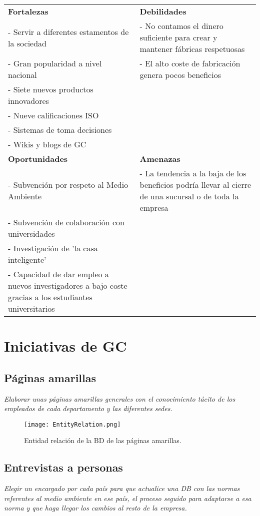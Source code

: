 \documentclass[a4paper]{article}
\begin{document}
\begin{table}[ht!]
	\centering
	\begin{tabular}{p{6cm}|p{6cm}}
		\textbf{Fortalezas} & \textbf{Debilidades}\\
		- Servir a diferentes estamentos de la sociedad & - No contamos el dinero suficiente para crear y mantener fábricas respetuosas \\
		- Gran popularidad a nivel nacional & - El alto coste de fabricación genera pocos beneficios \\
		- Siete nuevos productos innovadores & \\
		- Nueve calificaciones ISO & \\
		- Sistemas de toma decisiones & \\
		- Wikis y blogs de GC & \\\hline
		\textbf{Oportunidades} & \textbf{Amenazas} \\
		- Subvención por respeto al Medio Ambiente & - La tendencia a la baja de los beneficios podría llevar al cierre de una sucursal o de toda la empresa\\
		- Subvención de colaboración con universidades & \\
		- Investigación de 'la casa inteligente' & \\
		- Capacidad de dar empleo a nuevos investigadores a bajo coste gracias a los estudiantes universitarios
	\end{tabular}
\end{table}

\newpage

\section{Iniciativas de GC}

\subsection{Páginas amarillas}

\textit{Elaborar unas páginas amarillas generales con el conocimiento tácito de los empleados de cada departamento y las diferentes sedes.}

\begin{figure}[ht!]
	\texttt{[image: EntityRelation.png]}
	\caption{Entidad relación de la BD de las páginas amarillas.}
	\label{fig:boat1}
\end{figure}


\subsection{Entrevistas a personas}
\textit{Elegir un encargado por cada país para que actualice una DB con las normas referentes al medio ambiente en ese país, el proceso seguido para adaptarse a esa norma y que haga llegar los cambios al resto de la empresa.}
\end{document}
